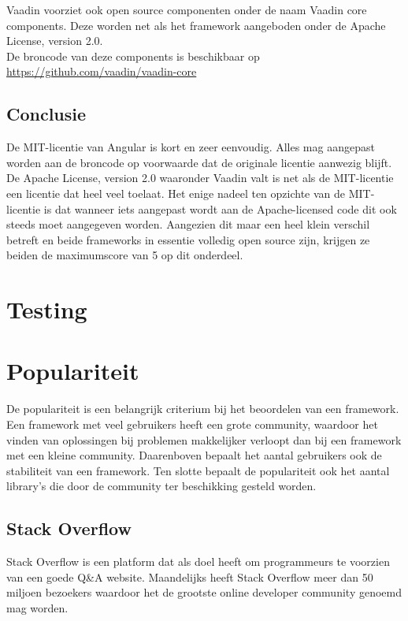 Vaadin voorziet ook open source componenten onder de naam Vaadin core components. Deze worden net als het framework aangeboden onder de Apache License, version 2.0.
\\ De broncode van deze components is beschikbaar op 
\\ \url{https://github.com/vaadin/vaadin-core }

\subsection{Conclusie}
De MIT-licentie van Angular is kort en zeer eenvoudig. Alles mag aangepast worden aan de broncode op voorwaarde dat de originale licentie aanwezig blijft. 
De Apache License, version 2.0 waaronder Vaadin valt is net als de MIT-licentie een licentie dat heel veel toelaat. Het enige nadeel ten opzichte van de MIT-licentie is dat wanneer iets aangepast wordt aan de Apache-licensed code dit ook steeds moet aangegeven worden.
Aangezien dit maar een heel klein verschil betreft en beide frameworks in essentie volledig open source zijn, krijgen ze beiden de maximumscore van 5 op dit onderdeel.

\section{Testing}


\section{Populariteit}
De populariteit is een belangrijk criterium bij het beoordelen van een framework. Een framework met veel gebruikers heeft een grote community, waardoor het vinden van oplossingen bij problemen makkelijker verloopt dan bij een framework met een kleine community. Daarenboven bepaalt het aantal gebruikers ook de stabiliteit van een framework. Ten slotte bepaalt de populariteit ook het aantal library's die door de community ter beschikking gesteld worden.
\subsection{Stack Overflow}
Stack Overflow is een platform dat als doel heeft om programmeurs te voorzien van een goede Q\&A website. Maandelijks heeft Stack Overflow meer dan 50 miljoen bezoekers waardoor het de grootste online developer community genoemd mag worden. 
